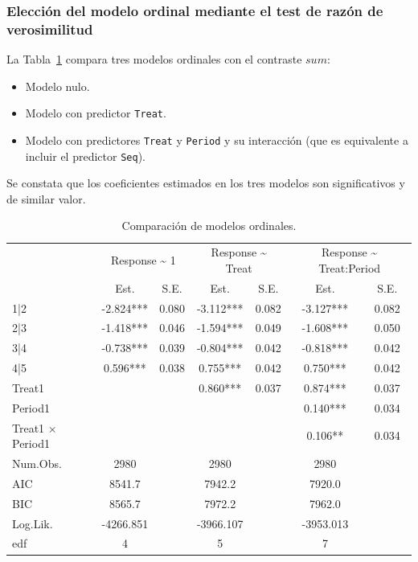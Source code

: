 \documentclass[
  12pt,
  a4paper,
  extrafontsizes,
  onecolumn,
  openright,
  table]{memoir}
\providecommand{\tightlist}{%
  \setlength{\itemsep}{0pt}\setlength{\parskip}{0pt}}\usepackage{longtable,booktabs,array}
\begin{document}
\hypertarget{sec-mejor-modelo-efectos-fijos}{%
\subsubsection{Elección del modelo ordinal mediante el test de razón de
verosimilitud}\label{sec-mejor-modelo-efectos-fijos}}

La Tabla~\ref{tbl-ordinal-com} compara tres modelos ordinales con el
contraste \(sum\):

\begin{itemize}
\tightlist
\item
  Modelo nulo.
\item
  Modelo con predictor \texttt{Treat}.
\item
  Modelo con predictores \texttt{Treat} y \texttt{Period} y su
  interacción (que es equivalente a incluir el predictor \texttt{Seq}).
\end{itemize}

Se constata que los coeficientes estimados en los tres modelos son
significativos y de similar valor.

\scriptsize

\hypertarget{tbl-ordinal-com}{}
\begin{longtable}{lcccccc}
\caption{\label{tbl-ordinal-com}Comparación de modelos ordinales. }\tabularnewline

\toprule
 & \multicolumn{2}{c}{Response \textasciitilde{} 1    } & \multicolumn{2}{c}{Response \textasciitilde{} Treat    } & \multicolumn{2}{c}{Response \textasciitilde{} Treat:Period    } \\ 
\cmidrule(lr){2-3} \cmidrule(lr){4-5} \cmidrule(lr){6-7}
  & Est. & S.E. & Est.  & S.E.  & Est.   & S.E.   \\ 
\midrule
1|2  & -2.824*** & 0.080 & -3.112*** & 0.082 & -3.127*** & 0.082 \\ 
2|3  & -1.418*** & 0.046 & -1.594*** & 0.049 & -1.608*** & 0.050 \\ 
3|4  & -0.738*** & 0.039 & -0.804*** & 0.042 & -0.818*** & 0.042 \\ 
4|5  & 0.596*** & 0.038 & 0.755*** & 0.042 & 0.750*** & 0.042 \\ 
Treat1  &  &  & 0.860*** & 0.037 & 0.874*** & 0.037 \\ 
Period1  &  &  &  &  & 0.140*** & 0.034 \\ 
Treat1 × Period1  &  &  &  &  & 0.106** & 0.034 \\ 
Num.Obs. & 2980 &  & 2980 &  & 2980 &  \\ 
AIC & 8541.7 &  & 7942.2 &  & 7920.0 &  \\ 
BIC & 8565.7 &  & 7972.2 &  & 7962.0 &  \\ 
Log.Lik. & -4266.851 &  & -3966.107 &  & -3953.013 &  \\ 
edf & 4 &  & 5 &  & 7 &  \\ 
\bottomrule
\end{longtable}
\end{document}
